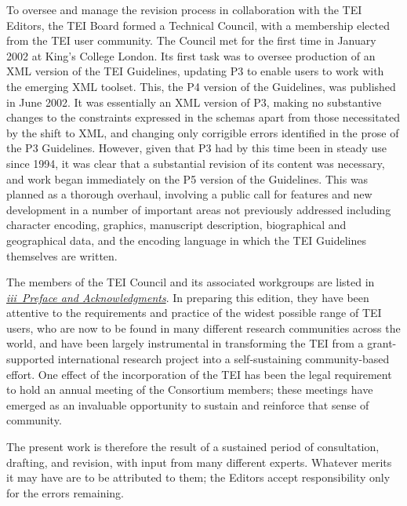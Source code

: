 To oversee and manage the revision process in collaboration with the TEI Editors, the TEI Board formed a Technical Council, with a membership elected from the TEI user community. The Council met for the first time in January 2002 at King's College London. Its first task was to oversee production of an XML version of the TEI Guidelines, updating P3 to enable users to work with the emerging XML toolset. This, the P4 version of the Guidelines, was published in June 2002. It was essentially an XML version of P3, making no substantive changes to the constraints expressed in the schemas apart from those necessitated by the shift to XML, and changing only corrigible errors identified in the prose of the P3 Guidelines. However, given that P3 had by this time been in steady use since 1994, it was clear that a substantial revision of its content was necessary, and work began immediately on the P5 version of the Guidelines. This was planned as a thorough overhaul, involving a public call for features and new development in a number of important areas not previously addressed including character encoding, graphics, manuscript description, biographical and geographical data, and the encoding language in which the TEI Guidelines themselves are written. \par
The members of the TEI Council and its associated workgroups are listed in \textit{\hyperref[FM1]{iii\ Preface and Acknowledgments}}. In preparing this edition, they have been attentive to the requirements and practice of the widest possible range of TEI users, who are now to be found in many different research communities across the world, and have been largely instrumental in transforming the TEI from a grant-supported international research project into a self-sustaining community-based effort. One effect of the incorporation of the TEI has been the legal requirement to hold an annual meeting of the Consortium members; these meetings have emerged as an invaluable opportunity to sustain and reinforce that sense of community.\par
The present work is therefore the result of a sustained period of consultation, drafting, and revision, with input from many different experts. Whatever merits it may have are to be attributed to them; the Editors accept responsibility only for the errors remaining. 
